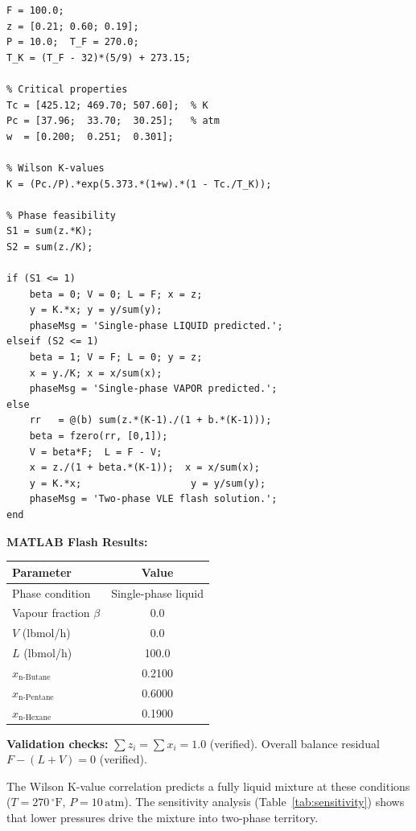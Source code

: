 \documentclass[12pt,a4paper]{article}
\begin{document}
\begin{lstlisting}[style=matlabstyle, caption={Q5 -- Flash vaporization in MATLAB}]
F = 100.0;
z = [0.21; 0.60; 0.19];
P = 10.0;  T_F = 270.0;
T_K = (T_F - 32)*(5/9) + 273.15;

% Critical properties
Tc = [425.12; 469.70; 507.60];  % K
Pc = [37.96;  33.70;  30.25];   % atm
w  = [0.200;  0.251;  0.301];

% Wilson K-values
K = (Pc./P).*exp(5.373.*(1+w).*(1 - Tc./T_K));

% Phase feasibility
S1 = sum(z.*K);
S2 = sum(z./K);

if (S1 <= 1)
    beta = 0; V = 0; L = F; x = z;
    y = K.*x; y = y/sum(y);
    phaseMsg = 'Single-phase LIQUID predicted.';
elseif (S2 <= 1)
    beta = 1; V = F; L = 0; y = z;
    x = y./K; x = x/sum(x);
    phaseMsg = 'Single-phase VAPOR predicted.';
else
    rr   = @(b) sum(z.*(K-1)./(1 + b.*(K-1)));
    beta = fzero(rr, [0,1]);
    V = beta*F;  L = F - V;
    x = z./(1 + beta.*(K-1));  x = x/sum(x);
    y = K.*x;                   y = y/sum(y);
    phaseMsg = 'Two-phase VLE flash solution.';
end
\end{lstlisting}

\textbf{MATLAB Flash Results:}

\begin{center}
\begin{tabular}{lc}
  \toprule
  \textbf{Parameter} & \textbf{Value} \\
  \midrule
  Phase condition & Single-phase liquid \\
  Vapour fraction $\beta$ & 0.0 \\
  $V$ (lbmol/h) & 0.0 \\
  $L$ (lbmol/h) & 100.0 \\
  $x_{\text{n-Butane}}$ & 0.2100 \\
  $x_{\text{n-Pentane}}$ & 0.6000 \\
  $x_{\text{n-Hexane}}$ & 0.1900 \\
  \bottomrule
\end{tabular}
\end{center}

\textbf{Validation checks:} $\sum z_i = \sum x_i = 1.0$ (verified). Overall balance residual $F-(L+V) = 0$ (verified).

The Wilson K-value correlation predicts a fully liquid mixture at these conditions
($T = 270\,^{\circ}\text{F}$, $P = 10\,\text{atm}$). The sensitivity analysis (Table~\ref{tab:sensitivity})
shows that lower pressures drive the mixture into two-phase territory.
\end{document}
